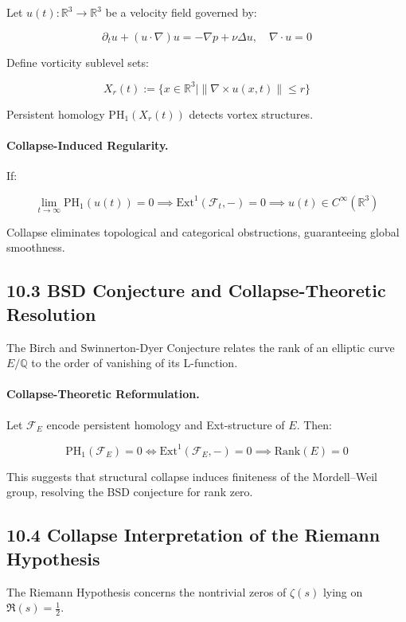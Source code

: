 \documentclass[11pt]{article}
\begin{document}
Let \( u(t) : \mathbb{R}^3 \to \mathbb{R}^3 \) be a velocity field governed by:

\[
\partial_t u + (u \cdot \nabla)u = -\nabla p + \nu \Delta u, \quad \nabla \cdot u = 0
\]

Define vorticity sublevel sets:

\[
X_r(t) := \{ x \in \mathbb{R}^3 \mid \| \nabla \times u(x,t) \| \leq r \}
\]

Persistent homology \( \mathrm{PH}_1(X_r(t)) \) detects vortex structures.

\paragraph{Collapse-Induced Regularity.}
If:

\[
\lim_{t \to \infty} \mathrm{PH}_1(u(t)) = 0 \implies \mathrm{Ext}^1(\mathcal{F}_t, -) = 0 \implies u(t) \in C^\infty(\mathbb{R}^3)
\]

Collapse eliminates topological and categorical obstructions, guaranteeing global smoothness.

\subsection*{10.3 BSD Conjecture and Collapse-Theoretic Resolution}

The Birch and Swinnerton-Dyer Conjecture relates the rank of an elliptic curve \( E/\mathbb{Q} \) to the order of vanishing of its L-function.

\paragraph{Collapse-Theoretic Reformulation.}
Let \( \mathcal{F}_E \) encode persistent homology and Ext-structure of \( E \). Then:

\[
\mathrm{PH}_1(\mathcal{F}_E) = 0 \iff \mathrm{Ext}^1(\mathcal{F}_E, -) = 0 \implies \mathrm{Rank}(E) = 0
\]

This suggests that structural collapse induces finiteness of the Mordell–Weil group, resolving the BSD conjecture for rank zero.

\subsection*{10.4 Collapse Interpretation of the Riemann Hypothesis}

The Riemann Hypothesis concerns the nontrivial zeros of \( \zeta(s) \) lying on \( \Re(s) = \frac{1}{2} \).
\end{document}
